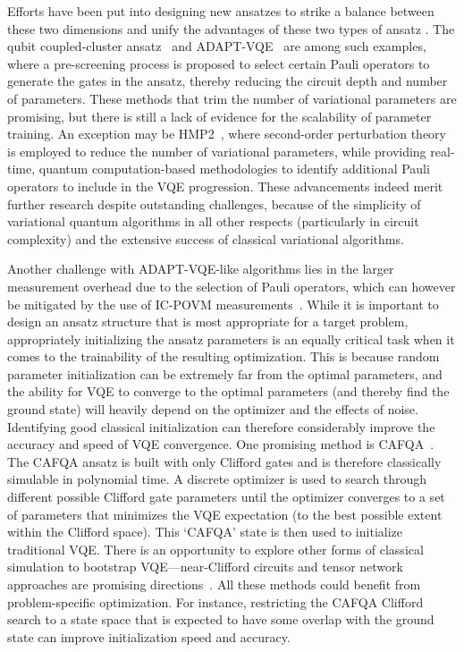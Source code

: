 Efforts have been put into designing new ansatzes to strike a balance between these two dimensions and unify the advantages of these two types of ansatz \cite{ryabinkin2018qubit,elfving2021simulating,motta2023bridging,tang2021qubit}.
The qubit coupled-cluster ansatz~\cite{ryabinkin2018qubit, ryabinkin2020iterative, huang_quantum_2023} and ADAPT-VQE~\cite{tang2021qubit} are among such examples, where a pre-screening process is proposed to select certain Pauli operators to generate the gates in the ansatz, thereby reducing the circuit depth and number of parameters.
These methods that trim the number of variational parameters are promising, but there is still a lack of evidence for the scalability of parameter training. An exception may be HMP2~\cite{wang2021resource}, where second-order perturbation theory is employed to reduce the number of variational parameters, while providing real-time, quantum computation-based methodologies to identify additional Pauli operators to include in the VQE progression. These advancements indeed merit further research despite outstanding challenges, because of the simplicity of variational quantum algorithms in all other respects (particularly in circuit complexity) and the extensive success of classical variational algorithms.

Another challenge with ADAPT-VQE-like algorithms lies in the larger measurement overhead due to the selection of Pauli operators, which can however be mitigated by the use of IC-POVM measurements~\cite{nykanen2023mitigating}.
While it is important to design an ansatz structure that is most appropriate for a target problem, appropriately initializing the ansatz parameters is an equally critical task when it comes to the trainability of the resulting optimization.
This is because random parameter initialization can be extremely far from the optimal parameters, and the ability for VQE to converge to the optimal parameters (and thereby find the ground state) will heavily depend on the optimizer and the effects of noise.
Identifying good classical initialization can therefore considerably improve the accuracy and speed of VQE convergence.
One promising method is CAFQA~\cite{ravi2023cafqa}.
The CAFQA ansatz is built with only Clifford gates and is therefore classically simulable in polynomial time.
A discrete optimizer is used to search through different possible Clifford gate parameters until the optimizer converges to a set of parameters that minimizes the VQE expectation (to the best possible extent within the Clifford space).
This `CAFQA' state is then used to initialize traditional VQE.
There is an opportunity to explore other forms of classical simulation to bootstrap VQE---near-Clifford circuits and tensor network approaches are promising directions~\cite{preopt-1,preopt-2}.
All these methods could benefit from problem-specific optimization.
For instance, restricting the CAFQA Clifford search to a state space that is expected to have some overlap with the ground state can improve initialization speed and accuracy.




